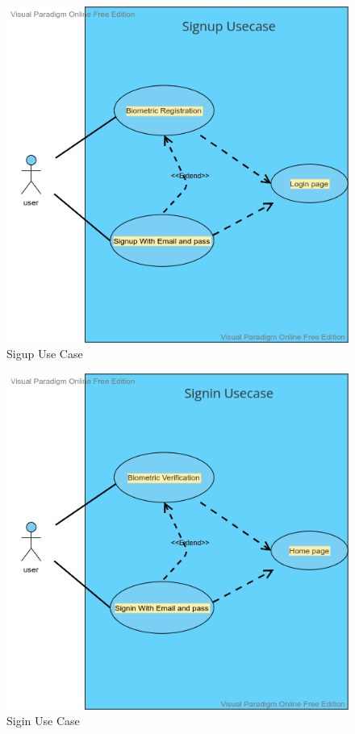 \documentclass[conference]{IEEEtran}
\begin{document}
\begin{figure}[htbp]
	\centerline{\includegraphics[width=1.0\columnwidth]{useup.png}}
	\caption{Sigup Use Case}
	\label{fig}
\end{figure}
\begin{figure}[htbp]
	\centerline{\includegraphics[width=1.0\columnwidth]{usein.png}}
	\caption{Sigin Use Case}
	\label{fig}
\end{figure}
\end{document}
